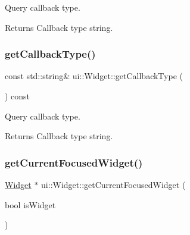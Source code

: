 Query callback type. \begin{DoxyReturn}{Returns}
Callback type string. 
\end{DoxyReturn}
\mbox{\label{classui_1_1Widget_a594b66f5c19a8395b7b67ab7b8aa70b4}} 
\subsubsection{\texorpdfstring{get\+Callback\+Type()}{getCallbackType()}\hspace{0.1cm}{\footnotesize\ttfamily [2/2]}}
{\footnotesize\ttfamily const std\+::string\& ui\+::\+Widget\+::get\+Callback\+Type (\begin{DoxyParamCaption}{ }\end{DoxyParamCaption}) const\hspace{0.3cm}{\ttfamily [inline]}}

Query callback type. \begin{DoxyReturn}{Returns}
Callback type string. 
\end{DoxyReturn}
\mbox{\label{classui_1_1Widget_ae577cff6759bee4c6de4ff9a8ec459ab}} 
\subsubsection{\texorpdfstring{get\+Current\+Focused\+Widget()}{getCurrentFocusedWidget()}\hspace{0.1cm}{\footnotesize\ttfamily [1/4]}}
{\footnotesize\ttfamily \hyperlink{classui_1_1Widget}{Widget} $\ast$ ui\+::\+Widget\+::get\+Current\+Focused\+Widget (\begin{DoxyParamCaption}\item[{bool}]{is\+Widget }\end{DoxyParamCaption})\hspace{0.3cm}{\ttfamily [inline]}}

